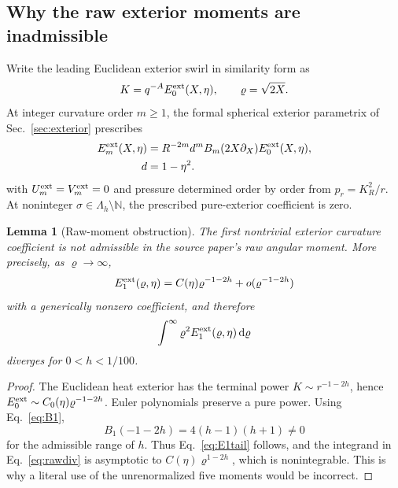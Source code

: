 \documentclass[aps,prd,reprint,superscriptaddress,nofootinbib,floatfix]{revtex4-2}
\newtheorem{lemma}[theorem]{Lemma}
\theoremstyle{definition}
\theoremstyle{remark}
\newcommand{\dd}{\mathrm{d}}
\newcommand{\Lam}{\Lambda_h}
\begin{document}
\subsection{Why the raw exterior moments are inadmissible}
Write the leading Euclidean exterior swirl in similarity form as
\begin{equation}
	K=q^{-A}E^{\rm ext}_0(X,\eta),\qquad \varrho=\sqrt{2X}.
	\label{eq:E0ext}
\end{equation}
At integer curvature order $m\ge1$, the formal spherical exterior parametrix of Sec.~\ref{sec:exterior} prescribes
\begin{align}
	E_m^{\rm ext}(X,\eta)
	  & =R^{-2m}d^m B_m(2X\partial_X)E^{\rm ext}_0(X,\eta),\label{eq:Emext} \\
	d & =1-\eta^2.\nonumber
\end{align}
with $U_m^{\rm ext}=V_m^{\rm ext}=0$ and pressure determined order by order from $p_r=K_R^2/r$.  At noninteger $\sigma\in\Lam\setminus\mathbb N$, the prescribed pure-exterior coefficient is zero.

\begin{lemma}[Raw-moment obstruction]\label{lem:rawmoment}
	The first nontrivial exterior curvature coefficient is not admissible in the source paper's raw angular moment.  More precisely, as $\varrho\to\infty$,
	\begin{equation}
		E_1^{\rm ext}(\varrho,\eta)
		=C(\eta)\varrho^{-1-2h}+o(\varrho^{-1-2h})
		\label{eq:E1tail}
	\end{equation}
	with a generically nonzero coefficient, and therefore
	\begin{equation}
		\int^\infty \varrho^2E_1^{\rm ext}(\varrho,\eta)\,\dd\varrho
		\label{eq:rawdiv}
	\end{equation}
	diverges for $0<h<1/100$.
\end{lemma}

\begin{proof}
	The Euclidean heat exterior has the terminal power $K\sim r^{-1-2h}$, hence $E^{\rm ext}_0\sim C_0(\eta)\varrho^{-1-2h}$.  Euler polynomials preserve a pure power.  Using Eq.~\eqref{eq:B1},
	\begin{equation}
		B_1(-1-2h)=4(h-1)(h+1)\neq0
	\end{equation}
	for the admissible range of $h$.  Thus Eq.~\eqref{eq:E1tail} follows, and the integrand in Eq.~\eqref{eq:rawdiv} is asymptotic to $C(\eta)\varrho^{1-2h}$, which is nonintegrable.  This is why a literal use of the unrenormalized five moments would be incorrect.
\end{proof}
\end{document}
